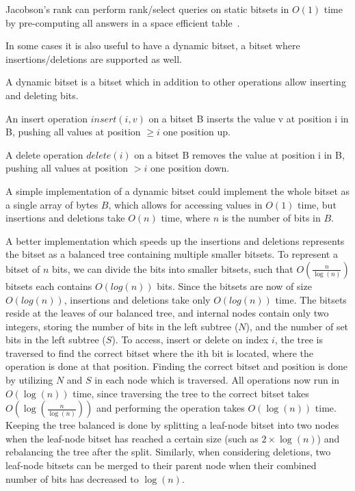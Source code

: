 Jacobson's rank can perform rank/select queries on static bitsets in $O(1)$ time by
pre-computing all answers in a space efficient table~\cite{JacobsonsRank}.

In some cases it is also useful to have a dynamic bitset, a bitset where
insertions/deletions are supported as well.

\begin{definition}

    A dynamic bitset is a bitset which in addition to other operations allow inserting and
    deleting bits.

    An insert operation $insert(i, v)$ on a bitset B inserts the value v at position i in
    B, pushing all values at position $\geq i$ one position up.

    A delete operation $delete(i)$ on a bitset B removes the value at position i in B, pushing all
    values at position $> i$ one position down.

\end{definition}

A simple implementation of a dynamic bitset could implement the whole bitset as a single
array of bytes $B$, which allows for accessing values in $O(1)$ time, but insertions and
deletions take $O(n)$ time, where $n$ is the number of bits in $B$.

A better implementation which speeds up the insertions and deletions represents the bitset
as a balanced tree containing multiple smaller bitsets. To represent a bitset of $n$ bits,
we can divide the bits into smaller bitsets, such that $O(\frac{n}{\log(n)})$ bitsets each
contains $O(log(n))$ bits. Since the bitsets are now of size $O(log(n))$, insertions and
deletions take only $O(log(n))$ time. The bitsets reside at the leaves of our balanced
tree, and internal nodes contain only two integers, storing the number of bits in the left
subtree ($N$), and the number of set bits in the left subtree ($S$). To access, insert or
delete on index $i$, the tree is traversed to find the correct bitset where the ith bit is
located, where the operation is done at that position. Finding the correct bitset and
position is done by utilizing $N$ and $S$ in each node which is traversed. All operations
now run in $O(\log(n))$ time, since traversing the tree to the correct bitset takes
$O(\log(\frac{n}{\log(n)}))$ and performing the operation takes $O(\log(n))$ time. Keeping
the tree balanced is done by splitting a leaf-node bitset into two nodes when the
leaf-node bitset has reached a certain size (such as $2 \times \log(n)$) and rebalancing
the tree after the split. Similarly, when considering deletions, two leaf-node bitsets can
be merged to their parent node when their combined number of bits has decreased to
$\log(n)$.

